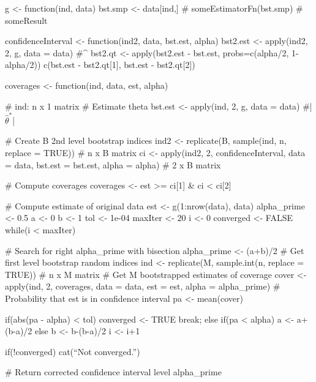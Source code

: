  \begin{code}
  g <- function(ind, data){
    bst.smp <- data[ind,]
    # someEstimatorFn(bst.smp)
    # someResult
  }
 
  confidenceInterval <- function(ind2, data, bst.est, alpha){
    bst2.est <- apply(ind2, 2, g, data = data) #\hat{\theta}^{\ast\ast}
    bst2.qt <- apply(bst2.est - bst.est, probs=c(alpha/2, 1-alpha/2))
    c(bst.est - bst2.qt[1], bst.est - bst2.qt[2])
  }
 
  coverages <- function(ind, data, est, alpha){ # ind: n x 1 matrix
    # Estimate theta
    bst.est <- apply(ind, 2, g, data = data) #|$\hat{\theta}^{\ast}$|
    
    # Create B 2nd level bootstrap indices
    ind2 <- replicate(B, sample(ind, n, replace = TRUE)) # n x B matrix
    ci <- apply(ind2, 2, confidenceInterval, data = data, bst.est = bst.est, alpha = alpha) # 2 x B matrix
    
    # Compute coverages
    coverages <- est >= ci[1] & ci < ci[2]
  }
 
  # Compute estimate of original data
  est <- g(1:nrow(data), data)
  alpha_prime <- 0.5
  a <- 0
  b <- 1
  tol <- 1e-04
  maxIter <- 20
  i <- 0
  converged <- FALSE
  while(i < maxIter){ # Search for right alpha_prime with bisection
    alpha_prime <- (a+b)/2
    # Get first level bootstrap random indices
    ind <- replicate(M, sample.int(n, replace = TRUE)) # n x M matrix
    # Get M bootstrapped estimates of coverage
    cover <- apply(ind, 2, coverages, data = data, est = est, alpha = alpha_prime)
    # Probability that est is in confidence interval
    pa <- mean(cover)
    
    if(abs(pa - alpha) < tol){
        converged <- TRUE
        break;
    }
    else{
        if(pa < alpha){
            a <- a+(b-a)/2
        }
        else{
            b <- b-(b-a)/2
        }
    }
    i <- i+1
  }
  
  if(!converged){
    cat(``Not converged.'')
  }
  
  # Return corrected confidence interval level
  alpha_prime
 \end{code}

